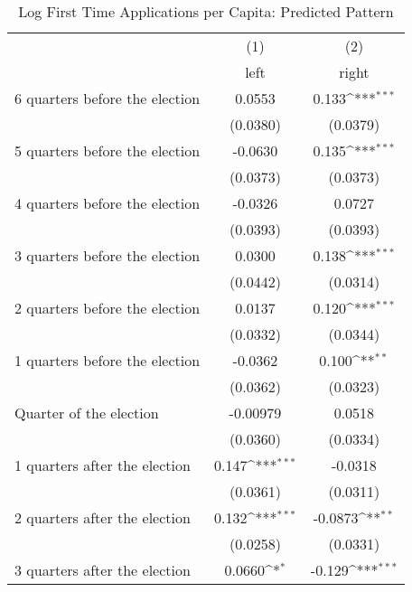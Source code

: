 \begin{table}[htbp]\centering
\def\sym#1{\ifmmode^{#1}\else\(^{#1}\)\fi}
\caption{Log First Time Applications per Capita: Predicted Pattern}
\begin{tabular}{l*{2}{c}}
\hline\hline
                    &\multicolumn{1}{c}{(1)}&\multicolumn{1}{c}{(2)}\\
                    &\multicolumn{1}{c}{left}&\multicolumn{1}{c}{right}\\
\hline
 6 quarters before the election&      0.0553         &       0.133\sym{***}\\
                    &    (0.0380)         &    (0.0379)         \\
[1em]
 5 quarters before the election&     -0.0630         &       0.135\sym{***}\\
                    &    (0.0373)         &    (0.0373)         \\
[1em]
 4 quarters before the election&     -0.0326         &      0.0727         \\
                    &    (0.0393)         &    (0.0393)         \\
[1em]
 3 quarters before the election&      0.0300         &       0.138\sym{***}\\
                    &    (0.0442)         &    (0.0314)         \\
[1em]
 2 quarters before the election&      0.0137         &       0.120\sym{***}\\
                    &    (0.0332)         &    (0.0344)         \\
[1em]
 1 quarters before the election&     -0.0362         &       0.100\sym{**} \\
                    &    (0.0362)         &    (0.0323)         \\
[1em]
Quarter of the election&    -0.00979         &      0.0518         \\
                    &    (0.0360)         &    (0.0334)         \\
[1em]
 1 quarters after the election&       0.147\sym{***}&     -0.0318         \\
                    &    (0.0361)         &    (0.0311)         \\
[1em]
 2 quarters after the election&       0.132\sym{***}&     -0.0873\sym{**} \\
                    &    (0.0258)         &    (0.0331)         \\
[1em]
 3 quarters after the election&      0.0660\sym{*}  &      -0.129\sym{***}\\

\end{tabular}
\end{table}
